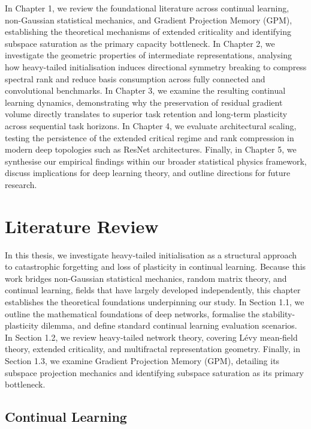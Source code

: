 \documentclass[11pt,oneside]{report}
\begin{document}
In Chapter 1, we review the foundational literature across continual learning, non-Gaussian statistical mechanics, and Gradient Projection Memory (GPM), establishing the theoretical mechanisms of extended criticality and identifying subspace saturation as the primary capacity bottleneck. In Chapter 2, we investigate the geometric properties of intermediate representations, analysing how heavy-tailed initialisation induces directional symmetry breaking to compress spectral rank and reduce basis consumption across fully connected and convolutional benchmarks. In Chapter 3, we examine the resulting continual learning dynamics, demonstrating why the preservation of residual gradient volume directly translates to superior task retention and long-term plasticity across sequential task horizons. In Chapter 4, we evaluate architectural scaling, testing the persistence of the extended critical regime and rank compression in modern deep topologies such as ResNet architectures. Finally, in Chapter 5, we synthesise our empirical findings within our broader statistical physics framework, discuss implications for deep learning theory, and outline directions for future research.

\chapter{Literature Review}
\label{chap:review}

In this thesis, we investigate heavy-tailed initialisation as a structural approach to catastrophic forgetting and loss of plasticity in continual learning. Because this work bridges non-Gaussian statistical mechanics, random matrix theory, and continual learning, fields that have largely developed independently, this chapter establishes the theoretical foundations underpinning our study. In Section 1.1, we outline the mathematical foundations of deep networks, formalise the stability-plasticity dilemma, and define standard continual learning evaluation scenarios. In Section 1.2, we review heavy-tailed network theory, covering Lévy mean-field theory, extended criticality, and multifractal representation geometry. Finally, in Section 1.3, we examine Gradient Projection Memory (GPM), detailing its subspace projection mechanics and identifying subspace saturation as its primary bottleneck.

\section{Continual Learning}
\end{document}
